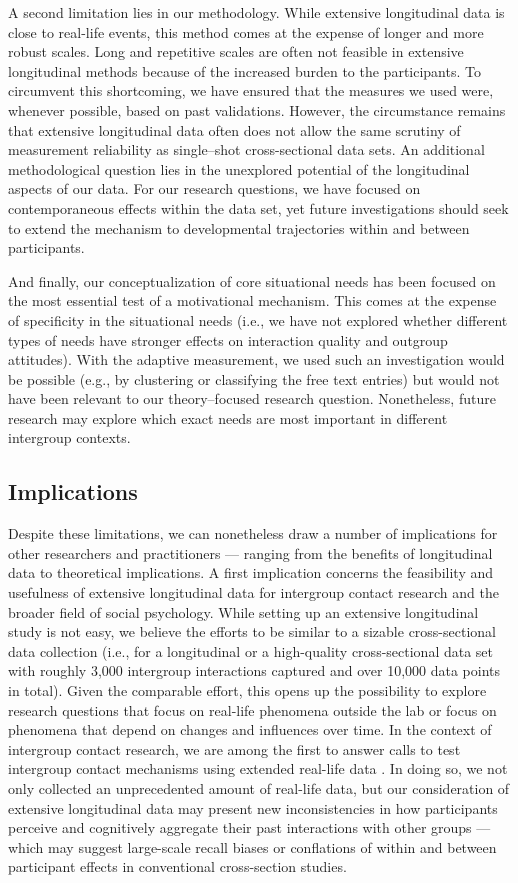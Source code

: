 \documentclass[man, 12pt, a4paper, mask]{apa7}
\theoremstyle{break}
\theoremstyle{plain}
\begin{document}
A second limitation lies in our methodology. While extensive longitudinal data is close to real-life events, this method comes at the expense of longer and more robust scales. Long and repetitive scales are often not feasible in extensive longitudinal methods because of the increased burden to the participants. To circumvent this shortcoming, we have ensured that the measures we used were, whenever possible, based on past validations. However, the circumstance remains that extensive longitudinal data often does not allow the same scrutiny of measurement reliability as single–shot cross-sectional data sets. An additional methodological question lies in the unexplored potential of the longitudinal aspects of our data. For our research questions, we have focused on contemporaneous effects within the data set, yet future investigations should seek to extend the mechanism to developmental trajectories within and between participants. 

And finally, our conceptualization of core situational needs has been focused on the most essential test of a motivational mechanism. This comes at the expense of specificity in the situational needs (i.e., we have not explored whether different types of needs have stronger effects on interaction quality and outgroup attitudes). With the adaptive measurement, we used such an investigation would be possible (e.g., by clustering or classifying the free text entries) but would not have been relevant to our theory–focused research question. Nonetheless, future research may explore which exact needs are most important in different intergroup contexts. 

\subsection{Implications}
Despite these limitations, we can nonetheless draw a number of implications for other researchers and practitioners --- ranging from the benefits of longitudinal data to theoretical implications. A first implication concerns the feasibility and usefulness of extensive longitudinal data for intergroup contact research and the broader field of social psychology. While setting up an extensive longitudinal study is not easy, we believe the efforts to be similar to a sizable cross-sectional data collection (i.e., for a longitudinal or a high-quality cross-sectional data set with roughly 3,000 intergroup interactions captured and over 10,000 data points in total). Given the comparable effort, this opens up the possibility to explore research questions that focus on real-life phenomena outside the lab or focus on phenomena that depend on changes and influences over time. In the context of intergroup contact research, we are among the first to answer calls to test intergroup contact mechanisms using extended real-life data \citep[e.g.,][]{Pettigrew2011, MacInnis2015}. In doing so, we not only collected an unprecedented amount of real-life data, but our consideration of extensive longitudinal data may present new inconsistencies in how participants perceive and cognitively aggregate their past interactions with other groups — which may suggest large-scale recall biases or conflations of within and between participant effects in conventional cross-section studies.
\end{document}
